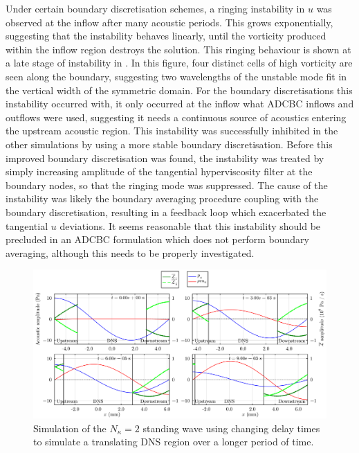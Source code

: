 Under certain boundary discretisation schemes, a ringing instability in $u$ was observed at the inflow after many acoustic periods. This grows exponentially, suggesting that the instability behaves linearly, until the vorticity produced within the inflow region destroys the solution. This ringing behaviour is shown at a late stage of instability in . In this figure, four distinct cells of high vorticity are seen along the boundary, suggesting two wavelengths of the unstable mode fit in the vertical width of the symmetric domain. For the boundary discretisations this instability occurred with, it only occurred at the inflow what ADCBC inflows and outflows were used, suggesting it needs a continuous source of acoustics entering the upstream acoustic region. This instability was successfully inhibited in the other simulations by using a more stable boundary discretisation. Before this improved boundary discretisation was found, the instability was treated by simply increasing amplitude of the tangential hyperviscosity filter at the boundary nodes, so that the ringing mode was suppressed. The cause of the instability was likely the boundary averaging procedure coupling with the boundary discretisation, resulting in a feedback loop which exacerbated the tangential $u$ deviations. It seems reasonable that this instability should be precluded in an ADCBC formulation which does not perform boundary averaging, although this needs to be properly investigated.
\fi

\begin{figure}[t]
\centering
\includegraphics[scale=0.30]{assets/graphs/ac-plot-3-4_moving.pdf}
\caption{Simulation of the $N_κ = 2$ standing wave using changing delay times to simulate a translating DNS region over a longer period of time.}
\label{fig:moving-dns-region}
\end{figure}

